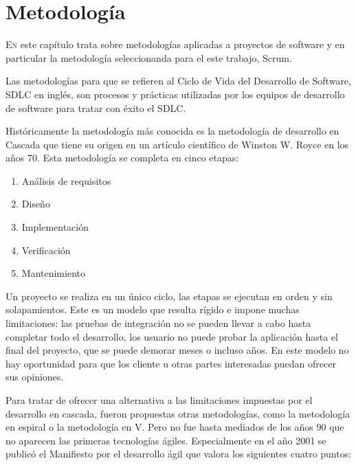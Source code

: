 
\chapter{Metodología}
\label{chap:metodologia}

\lettrine{E}{n} este capítulo trata sobre metodologías aplicadas a proyectos de software y en particular la metodología seleccionanda para el este trabajo, Scrum.



Las metodologías para que se refieren al Ciclo de Vida del Desarrollo de Software, SDLC en inglés, son procesos y prácticas utilizadas por los equipos de desarrollo de software para tratar con éxito el SDLC.

Históricamente la metodología más conocida es la metodología de desarrollo en Cascada que tiene su origen en un artículo científico de Winston W. Royce en los años 70. Esta metodología se completa en cinco etapas:

\begin{enumerate}
    \item Análisis de requisitos
    \item Diseño
    \item Implementación
    \item Verificación
    \item Mantenimiento
\end{enumerate}

Un proyecto se realiza en un único ciclo,  las etapas se ejecutan en orden y sin solapamientos. Este es un modelo que resulta rígido e impone muchas limitaciones: las pruebas de integración no se pueden llevar a cabo hasta completar todo el desarrollo, los usuario no puede probar la aplicación hasta el final del proyecto, que se puede demorar meses o incluso años. En este modelo no hay oportunidad para que los cliente u otras partes interesadas puedan ofrecer sus opiniones.

Para tratar de ofrecer una alternativa a las limitaciones impuestas por el desarrollo en cascada, fueron propuestas otras metodologías, como la metodología en espiral o la metodología en V. Pero no fue hasta mediados de los años 90 que no aparecen las primeras tecnologías ágiles. Especialmente en el año 2001 se publicó el Manifiesto por el desarrollo ágil que valora los siguientes cuatro puntos:

